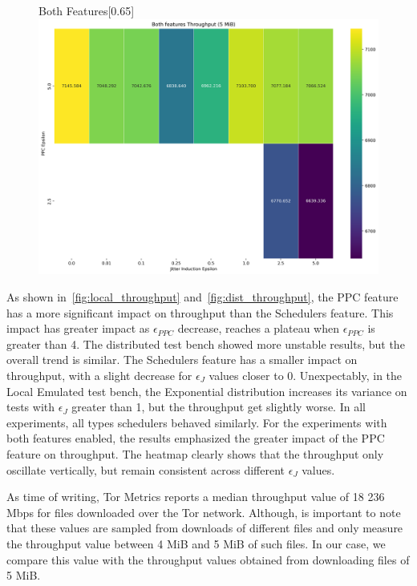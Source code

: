 \begin{figure}[htbp]
\begin{subcaptionbox}{Both Features\label{fig:dist_both_throughput}}[0.65\textwidth]
        {\includegraphics[width=\linewidth]{Chapters/Figures/Plots/dist_throughput_50_heatmap_5mib.png}}
    \end{subcaptionbox}
\end{figure}

As shown in~\autoref{fig:local_throughput} and~\autoref{fig:dist_throughput}, the PPC feature has a more significant impact on throughput than the Schedulers feature. 
This impact has greater impact as $\epsilon_{PPC}$ decrease, reaches a plateau when $\epsilon_{PPC}$ is greater than 4. The distributed test bench showed more unstable results, but the overall trend is similar. The Schedulers feature has a smaller impact on throughput, with a slight decrease for $\epsilon_{J}$ values closer to 0. Unexpectably, in the Local Emulated test bench, the Exponential distribution increases its variance on tests with $\epsilon_{J}$ greater than 1, but the throughput get slightly worse. 
In all experiments, all types schedulers behaved similarly.
For the experiments with both features enabled, the results emphasized the greater impact of the PPC feature on throughput. The heatmap clearly shows that the throughput only oscillate vertically, but remain consistent across different $\epsilon_{J}$ values.

As time of writing, Tor Metrics reports a median throughput value of 18 236 Mbps for files downloaded over the Tor network. Although, is important to note that these values are sampled from downloads of different files and only measure the throughput value between 4 MiB and 5 MiB of such files. In our case, we compare this value with the throughput values obtained from downloading files of 5 MiB.

